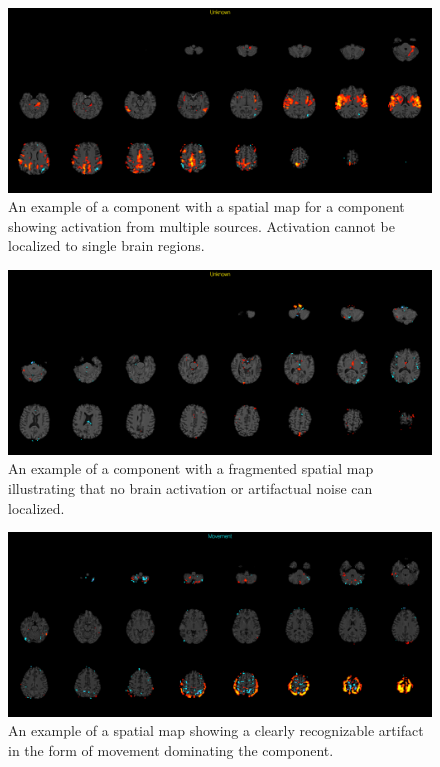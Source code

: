 \begin{figure}[H]                 
	\includegraphics[width=.8\textwidth]{figures/bMethods/Unknown}  
	\caption{An example of a  component with a spatial map for a component showing activation from multiple sources. Activation cannot be localized to single brain regions.}
	\label{fig:meth:Unknown} 
\end{figure}

\begin{figure}[H]                 
	\includegraphics[width=.8\textwidth]{figures/bMethods/Frag}  
	\caption{An example of a component with a fragmented spatial map illustrating that no brain activation or artifactual noise can localized.}
	\label{fig:meth:Frag} 
\end{figure}

\begin{figure}[H]                 
	\includegraphics[width=.8\textwidth]{figures/bMethods/Movement}  
	\caption{An example of a spatial map showing a clearly recognizable artifact in the form of movement dominating the component.}
	\label{fig:meth:Movement} 
\end{figure}






 